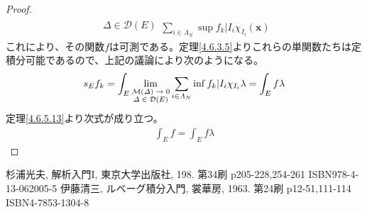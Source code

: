 \documentclass[dvipdfmx]{jsarticle}
\begin{document}
\begin{proof}
\begin{align*}
{\begin{matrix}
\varDelta \in \mathcal{D}(E) \\
\end{matrix}}{\sum_{i \in \varLambda_{N}} {\sup{f_{k}|I_{i}}\chi_{I_{i}}}}\left( \mathbf{x} \right)
\end{align*}
これにより、その関数$f$は可測である。定理\ref{4.6.3.5}よりこれらの単関数たちは定積分可能であるので、上記の議論により次のようになる。
\begin{align*}
s_{E}f_{k} = \int_{E} {\lim_{\scriptsize \begin{matrix}
\mathcal{M}(\varDelta) \rightarrow 0 \\
\varDelta \in \mathcal{D}(E) \\
\end{matrix}}{\sum_{i \in \varLambda_{N}} {\inf{f_{k}|I_{i}}\chi_{I_{i}}}}\lambda} = \int_{E} {f\lambda}
\end{align*}
定理\ref{4.6.5.13}より次式が成り立つ。
\begin{align*}
\int_{E} f = \int_{E} {f\lambda}
\end{align*}
\end{proof}
\begin{thebibliography}{50}
  杉浦光夫, 解析入門I, 東京大学出版社, 198. 第34刷 p205-228,254-261 ISBN978-4-13-062005-5
  伊藤清三, ルベーグ積分入門, 裳華房, 1963. 第24刷 p12-51,111-114 ISBN4-7853-1304-8
\end{thebibliography}
\end{document}
